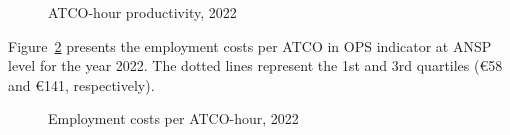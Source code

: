 \documentclass[
  letterpaper,
  DIV=11,
  numbers=noendperiod]{scrreprt}
\begin{document}
\hfill\break

\begin{figure}[h]


\caption{\label{fig-figure-4-5}ATCO-hour productivity, 2022}

\end{figure}%

Figure~\ref{fig-figure-4-6} presents the employment costs per ATCO in
OPS indicator at ANSP level for the year 2022. The dotted lines
represent the 1st and 3rd quartiles (€58 and €141, respectively).

\hfill\break

\begin{figure}[h]


\caption{\label{fig-figure-4-6}Employment costs per ATCO-hour, 2022}

\end{figure}%
\end{document}
